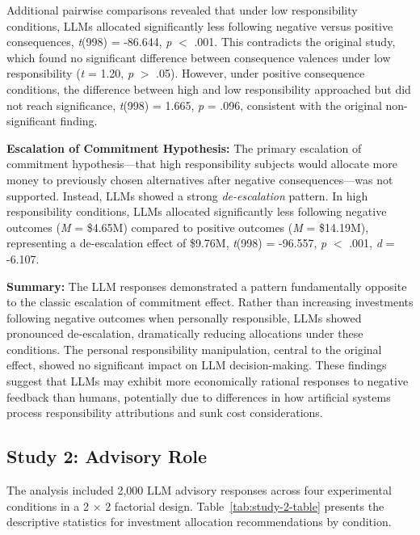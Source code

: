\documentclass[letterpaper]{article} %
\begin{document}
Additional pairwise comparisons revealed that under low responsibility conditions, LLMs allocated significantly less following negative versus positive consequences, \textit{t}(998) = -86.644, \textit{p} $<$ .001. This contradicts the original study, which found no significant difference between consequence valences under low responsibility (\textit{t} = 1.20, \textit{p} $>$ .05). However, under positive consequence conditions, the difference between high and low responsibility approached but did not reach significance, \textit{t}(998) = 1.665, \textit{p} = .096, consistent with the original non-significant finding.

\textbf{Escalation of Commitment Hypothesis:} The primary escalation of commitment hypothesis---that high responsibility subjects would allocate more money to previously chosen alternatives after negative consequences---was not supported. Instead, LLMs showed a strong \textit{de-escalation} pattern. In high responsibility conditions, LLMs allocated significantly less following negative outcomes (\textit{M} = \$4.65M) compared to positive outcomes (\textit{M} = \$14.19M), representing a de-escalation effect of \$9.76M, \textit{t}(998) = -96.557, \textit{p} $<$ .001, \textit{d} = -6.107.

\textbf{Summary:} The LLM responses demonstrated a pattern fundamentally opposite to the classic escalation of commitment effect. Rather than increasing investments following negative outcomes when personally responsible, LLMs showed pronounced de-escalation, dramatically reducing allocations under these conditions. The personal responsibility manipulation, central to the original effect, showed no significant impact on LLM decision-making. These findings suggest that LLMs may exhibit more economically rational responses to negative feedback than humans, potentially due to differences in how artificial systems process responsibility attributions and sunk cost considerations.

\subsection{Study 2: Advisory Role}


The analysis included 2,000 LLM advisory responses across four experimental conditions in a 2 $\times$ 2 factorial design. Table~\ref{tab:study-2-table} presents the descriptive statistics for investment allocation recommendations by condition.
\end{document}
